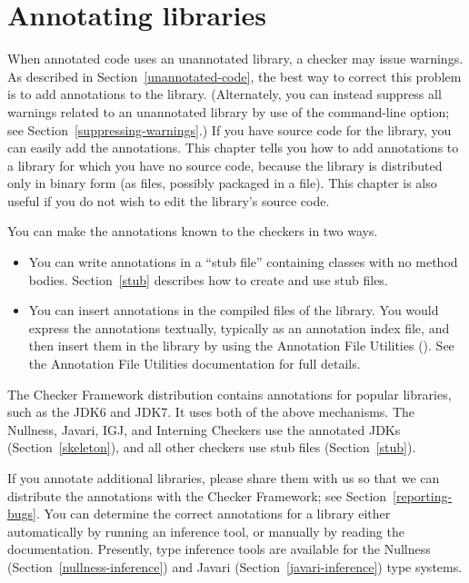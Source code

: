 \htmlhr
\chapter{Annotating libraries\label{annotating-libraries}}

When annotated code uses an unannotated library, a checker may issue warnings.
As described in Section~\ref{unannotated-code}, the best way to correct
this problem is to add annotations to the library.  (Alternately, you can instead
suppress all warnings related to an unannotated library by use of the
 command-line option; see
Section~\ref{suppressing-warnings}.)  If you have source code for the
library, you can easily add the annotations.
This chapter tells you
how to add annotations to a library for which you have no source code,
because the library is distributed only in binary form
(as  files, possibly packaged in a  file).
This chapter is also useful if you do not wish to edit the
library's source code.

You can make the annotations known to the checkers in two ways.

\begin{itemize}

\item
  You can write annotations in a ``stub
  file'' containing classes with no method bodies.
  Section~\ref{stub} describes how to create and use stub files.

\item
  You can insert annotations in the compiled
   files of the library.
  You would express the annotations textually, typically as an annotation index file, and
  then insert them in the library by using the Annotation File Utilities
  ().
  See the Annotation File Utilities documentation for full details.

\end{itemize}

The Checker Framework distribution contains annotations for popular
libraries, such as the JDK6 and JDK7\@.  It uses both of the above mechanisms.  The
Nullness, Javari, IGJ, and Interning Checkers use the annotated JDKs
(Section~\ref{skeleton}), and all other checkers use stub files
(Section~\ref{stub}).

If you annotate additional libraries, please share them with us so that we
can distribute the annotations with the Checker Framework; see
Section~\ref{reporting-bugs}.
You can determine the correct annotations for a library either
automatically by running an inference tool, or manually by reading the
documentation.  Presently, type inference tools are available for the
Nullness (Section~\ref{nullness-inference}) and Javari
(Section~\ref{javari-inference}) type systems.


